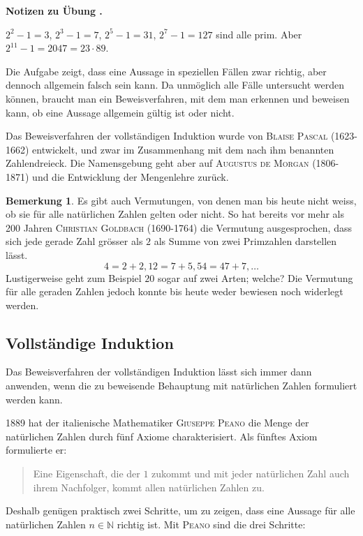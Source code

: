 \documentclass[%
11pt,%
twoside,%
titlepage,%
swissgerman,%
headsepline%
]{scrartcl}
\newcommand{\faReturnGray}{\textcolor{gray}{\faMailReply}} %
\theoremstyle{definition}
\newtheorem{bem}{Bemerkung}[subsection] %
\theoremstyle{plain}
\newcommand{\concatueb}[1]{ueb:#1}%
\newcommand{\concatlsg}[1]{lsg:#1}%
\newcounter{uebcounter}[section]
\renewcommand{\theuebcounter}{\thesection.\arabic{uebcounter}}  %
\newenvironment{lsg}[1]{%
    \par\noindent\textbf{Notizen zu Übung \theuebcounter\label{\concatlsg{#1}}}
    \hfill\hyperref[\concatueb{#1}]{\faReturnGray}\par %
}{%
    \par%
}
\begin{document}
\begin{lsg}{mersenne}
    $2^2-1=3$, $2^3-1=7$, $2^5-1=31$, $2^7-1=127$ sind alle prim. Aber $2^{11}-1=2047=23\cdot89$.
\end{lsg}

Die Aufgabe zeigt, dass eine Aussage in speziellen F\"allen zwar richtig, aber dennoch allgemein falsch sein kann. Da unm\"oglich alle F\"alle untersucht werden k\"onnen, braucht man ein Beweisverfahren, mit dem man erkennen und beweisen kann, ob eine Aussage allgemein g\"ultig ist oder nicht.

Das Beweisverfahren der vollst\"andigen Induktion wurde von \textsc{Blaise Pascal} (1623-1662) entwickelt, und zwar im Zusammenhang mit dem nach ihm benannten Zahlendreieck. Die Namensgebung geht aber auf \textsc{Augustus de Morgan} (1806-1871) und die Entwicklung der Mengenlehre zur\"uck.

\begin{bem}
Es gibt auch Vermutungen, von denen man bis heute nicht weiss, ob sie f\"ur alle nat\"urlichen Zahlen gelten oder nicht. So hat bereits vor mehr als 200 Jahren \textsc{Christian Goldbach} (1690-1764) die Vermutung ausgesprochen, dass sich jede gerade Zahl gr\"osser als $2$ als Summe von zwei Primzahlen darstellen l\"asst.
$$4 = 2 + 2, 12 = 7 + 5, 54 = 47 + 7, \dots$$
Lustigerweise geht zum Beispiel $20$ sogar auf zwei Arten; welche?
Die Vermutung f\"ur alle geraden Zahlen jedoch konnte bis heute weder bewiesen noch widerlegt werden.
\end{bem}

\subsection{Vollst\"andige Induktion}
Das Beweisverfahren der vollst\"andigen Induktion l\"asst sich immer dann anwenden, wenn die zu beweisende Behauptung mit nat\"urlichen Zahlen formuliert werden kann.

1889 hat der italienische Mathematiker \textsc{Giuseppe Peano} die Menge der nat\"urlichen Zahlen durch f\"unf Axiome charakterisiert. Als f\"unftes Axiom formulierte er:
\begin{quote}
Eine Eigenschaft, die der $1$ zukommt und mit jeder nat\"urlichen Zahl auch ihrem Nachfolger, kommt allen nat\"urlichen Zahlen zu.
\end{quote}

Deshalb gen\"ugen praktisch zwei Schritte, um zu zeigen, dass eine Aussage f\"ur alle nat\"urlichen Zahlen $n\in\mathbb{N}$ richtig ist. Mit \textsc{Peano} sind die drei Schritte:
\end{document}
